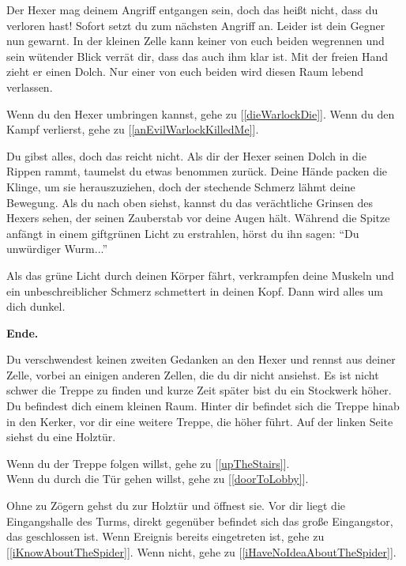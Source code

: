 
Der Hexer mag deinem Angriff entgangen sein, doch das heißt nicht, dass du verloren hast! Sofort setzt du zum nächsten Angriff an. Leider ist dein Gegner nun gewarnt. In der kleinen Zelle kann keiner von euch beiden wegrennen und sein wütender Blick verrät dir, dass das auch ihm klar ist. Mit der freien Hand zieht er einen Dolch. Nur einer von euch beiden wird diesen Raum lebend verlassen.

\monsterWarlock

Wenn du den Hexer umbringen kannst, gehe zu [\ref{dieWarlockDie}].
Wenn du den Kampf verlierst, gehe zu [\ref{anEvilWarlockKilledMe}].


Du gibst alles, doch das reicht nicht. Als dir der Hexer seinen Dolch in die Rippen rammt, taumelst du etwas benommen zurück. Deine Hände packen die Klinge, um sie herauszuziehen, doch der stechende Schmerz lähmt deine Bewegung. Als du nach oben siehst, kannst du das verächtliche Grinsen des Hexers sehen, der seinen Zauberstab vor deine Augen hält. Während die Spitze anfängt in einem giftgrünen Licht zu erstrahlen, hörst du ihn sagen: ``Du unwürdiger Wurm...''

Als das grüne Licht durch deinen Körper fährt, verkrampfen deine Muskeln und ein unbeschreiblicher Schmerz schmettert in deinen Kopf. Dann wird alles um dich dunkel.

\textbf{Ende.}


Du verschwendest keinen zweiten Gedanken an den Hexer und rennst aus deiner Zelle, vorbei an einigen anderen Zellen, die du dir nicht ansiehst. Es ist nicht schwer die Treppe zu finden und kurze Zeit später bist du ein Stockwerk höher. Du befindest dich einem kleinen Raum. Hinter dir befindet sich die Treppe hinab in den Kerker, vor dir eine weitere Treppe, die höher führt. Auf der linken Seite siehst du eine Holztür.

Wenn du der Treppe folgen willst, gehe zu [\ref{upTheStairs}].
\\Wenn du durch die Tür gehen willst, gehe zu [\ref{doorToLobby}].


Ohne zu Zögern gehst du zur Holztür und öffnest sie. Vor dir liegt die Eingangshalle des Turms, direkt gegenüber befindet sich das große Eingangstor, das geschlossen ist. Wenn Ereignis  bereits eingetreten ist, gehe zu [\ref{iKnowAboutTheSpider}].
Wenn nicht, gehe zu [\ref{iHaveNoIdeaAboutTheSpider}].

